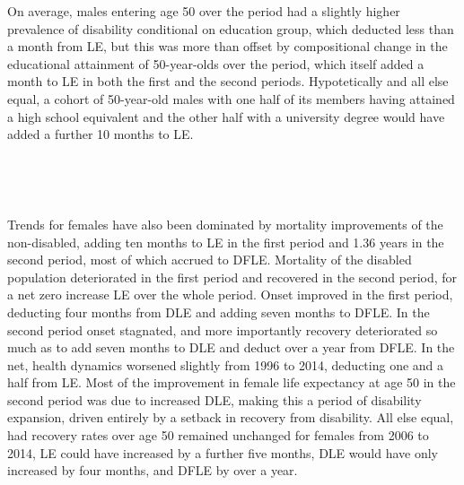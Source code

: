 On average, males entering age 50 over the period had a slightly higher prevalence of disability conditional on education group, which deducted less than a month from LE, but this was more than offset by compositional change in the educational attainment of 50-year-olds over the period, which itself added a month to LE in both the first and the second periods. Hypotetically and all else equal, a cohort of 50-year-old males with one half of its members having attained a high school equivalent and the other half with a university degree would have added a further 10 months to LE.

\begin{table}[!ht]
      \caption{Males. Contributions of changes in each transition, disability prevalence at age 50, and the education composition at age 50 to the change in DFLE, DLE, and LE (year units).}
      \label{tab:males}
      \centering
{}
~
\end{table}

\begin{table}[!ht]
      \caption{Females. Contributions of changes in each transition, disability prevalence at age 50, and the education composition at age 50 to the change in DFLE, DLE, and LE (year units).}
      \label{tab:females}
      \centering
{}
~
\end{table}

Trends for females have also been dominated by mortality improvements of the non-disabled, adding ten months to LE in the first period and 1.36 years in the second period, most of which accrued to DFLE. Mortality of the disabled population deteriorated in the first period and recovered in the second period, for a net zero increase LE over the whole period. Onset improved in the first period, deducting four months from DLE and adding seven months to DFLE. In the second period onset stagnated, and more importantly recovery deteriorated so much as to add seven months to DLE and deduct over a year from DFLE. In the net, health dynamics worsened slightly from 1996 to 2014, deducting one and a half from LE. Most of the improvement in female life expectancy at age 50 in the second period was due to increased DLE, making this a period of disability expansion, driven entirely by a setback in recovery from disability. All else equal, had recovery rates over age 50 remained unchanged for females from 2006 to 2014, LE could have increased by a further five months, DLE would have only increased by four months, and DFLE by over a year. 

